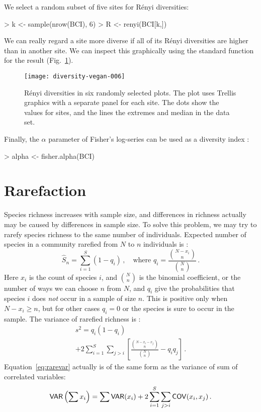 \documentclass[a4paper,10pt,twocolumn]{article}
\begin{document}
We select a random subset of five sites for R\'{e}nyi diversities:
\begin{Schunk}
\begin{Sinput}
> k <- sample(nrow(BCI), 6)
> R <- renyi(BCI[k,])
\end{Sinput}
\end{Schunk}
We can really regard a site more diverse if all of its R\'{e}nyi
diversities are higher than in another site.  We can inspect this
graphically using the standard  function for the
 result (Fig.~\ref{fig:renyi}).
\begin{figure}
\texttt{[image: diversity-vegan-006]}
\caption{R\'{e}nyi diversities in six randomly selected plots. The plot
  uses Trellis graphics with a separate panel for each site. The dots
  show the values for sites, and the lines the extremes and median in
  the data set.}
\label{fig:renyi}
\end{figure}

Finally, the $\alpha$ parameter of Fisher's log-series can be used as
a diversity index \citep{FisherEtal43}:
\begin{Schunk}
\begin{Sinput}
> alpha <- fisher.alpha(BCI)
\end{Sinput}
\end{Schunk}

\section{Rarefaction}

Species richness increases with sample size, and differences in
richness actually may be caused by differences in sample size.  To
solve this problem, we may try to rarefy species richness to the same
number of individuals.  Expected number of species in a community
rarefied from $N$ to $n$ individuals is \citep{Hurlbert71}:
\begin{equation}
\label{eq:rare}
\hat S_n = \sum_{i=1}^S (1 - q_i)\,, \quad\text{where }  q_i =
\frac{{N-x_i \choose n}}{{N \choose n}} \,.
\end{equation}
Here $x_i$ is the count of species $i$, and ${N \choose n}$ is the
binomial coefficient, or the number of ways we can choose $n$ from
$N$, and $q_i$ give the probabilities that species $i$ does \emph{not} occur in a
sample of size $n$.  This is positive only when $N-x_i \ge n$, but for
other cases $q_i = 0$ or the species is sure to occur in the sample.
The variance of rarefied richness is \citep{HeckEtal75}:
\begin{multline}
\label{eq:rarevar}
s^2 = q_i (1-q_i)  \\ + 2 \sum_{i=1}^S \sum_{j>i} \left[ \frac{{N- x_i - x_j
    \choose n}}{ {N
    \choose n}} - q_i q_j\right] \,.
\end{multline}
Equation~\ref{eq:rarevar} actually is of the same form as the variance
of sum of correlated variables:
\begin{equation}
\mathsf{VAR} \left(\sum x_i \right) = \sum \mathsf{VAR} (x_i) + 2 \sum_{i=1}^S
\sum_{j>i} \mathsf{COV} (x_i, x_j) \,.
\end{equation}
\end{document}
